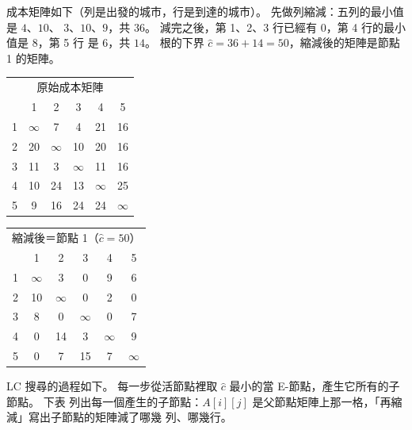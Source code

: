 成本矩陣如下（列是出發的城市，行是到達的城市）。 先做列縮減：五列的最小值是 $4$、$10$、
$3$、$10$、$9$，共 $36$。 減完之後，第 1、2、3 行已經有 $0$，第 4 行的最小值是 $8$，第 5 行
是 $6$，共 $14$。 根的下界 $\hat c = 36 + 14 = 50$，縮減後的矩陣是節點 1 的矩陣。

\begin{center}
\footnotesize
\setlength{\tabcolsep}{4pt}
\begin{tabular}[t]{c|ccccc}
\multicolumn{6}{c}{原始成本矩陣}\\
 & 1 & 2 & 3 & 4 & 5 \\\hline
1 & $\infty$ & 7 & 4 & 21 & 16 \\
2 & 20 & $\infty$ & 10 & 20 & 16 \\
3 & 11 & 3 & $\infty$ & 11 & 16 \\
4 & 10 & 24 & 13 & $\infty$ & 25 \\
5 & 9 & 16 & 24 & 24 & $\infty$ \\
\end{tabular}\qquad
\begin{tabular}[t]{c|ccccc}
\multicolumn{6}{c}{縮減後＝節點 1（$\hat c = 50$）}\\
 & 1 & 2 & 3 & 4 & 5 \\\hline
1 & $\infty$ & 3 & 0 & 9 & 6 \\
2 & 10 & $\infty$ & 0 & 2 & 0 \\
3 & 8 & 0 & $\infty$ & 0 & 7 \\
4 & 0 & 14 & 3 & $\infty$ & 9 \\
5 & 0 & 7 & 15 & 7 & $\infty$ \\
\end{tabular}
\end{center}

LC 搜尋的過程如下。 每一步從活節點裡取 $\hat c$ 最小的當 E-節點，產生它所有的子節點。 下表
列出每一個產生的子節點：$A[i][j]$ 是父節點矩陣上那一格，「再縮減」寫出子節點的矩陣減了哪幾
列、哪幾行。

